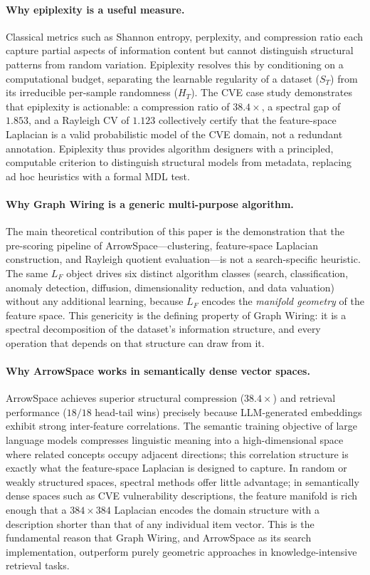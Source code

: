 \documentclass[12pt,a4paper]{article}
\theoremstyle{plain}
\theoremstyle{definition}
\theoremstyle{remark}
\newcommand{\1}{\mathbf{1}}
\begin{document}
	\paragraph{Why epiplexity is a useful measure.}
	Classical metrics such as Shannon entropy, perplexity, and compression
	ratio each capture partial aspects of information content but cannot
	distinguish structural patterns from random variation.
	Epiplexity \citep{finzi2026epiplexity} resolves this by conditioning
	on a computational budget, separating the learnable regularity of a
	dataset ($S_T$) from its irreducible per-sample randomness ($H_T$).
	The CVE case study demonstrates that epiplexity is actionable: a
	compression ratio of $38.4\times$, a spectral gap of $1.853$, and a
	Rayleigh CV of $1.123$ collectively certify that the feature-space
	Laplacian is a valid probabilistic model of the CVE domain, not a
	redundant annotation.
	Epiplexity thus provides algorithm designers with a principled, computable
	criterion to distinguish structural models from metadata, replacing
	ad hoc heuristics with a formal MDL test.
	
	\paragraph{Why Graph Wiring is a generic multi-purpose algorithm.}
	The main theoretical contribution of this paper is the demonstration that
	the pre-scoring pipeline of ArrowSpace---clustering, feature-space
	Laplacian construction, and Rayleigh quotient evaluation---is not a
	search-specific heuristic.
	The same $L_F$ object drives six distinct algorithm classes
	(search, classification, anomaly detection, diffusion, dimensionality
	reduction, and data valuation) without any additional learning, because
	$L_F$ encodes the \emph{manifold geometry} of the feature space.
	This genericity is the defining property of Graph Wiring: it is a
	spectral decomposition of the dataset's information structure, and
	every operation that depends on that structure can draw from it.
	
	\paragraph{Why ArrowSpace works in semantically dense vector spaces.}
	ArrowSpace achieves superior structural compression ($38.4\times$) and
	retrieval performance ($18/18$ head-tail wins) precisely because
	LLM-generated embeddings exhibit strong inter-feature correlations.
	The semantic training objective of large language models compresses
	linguistic meaning into a high-dimensional space where related concepts
	occupy adjacent directions; this correlation structure is exactly what
	the feature-space Laplacian is designed to capture.
	In random or weakly structured spaces, spectral methods offer little
	advantage; in semantically dense spaces such as CVE vulnerability
	descriptions, the feature manifold is rich enough that a $384\times 384$
	Laplacian encodes the domain structure with a description shorter than
	that of any individual item vector.
	This is the fundamental reason that Graph Wiring, and ArrowSpace as its
	search implementation, outperform purely geometric approaches in
	knowledge-intensive retrieval tasks.
	
\end{document}
